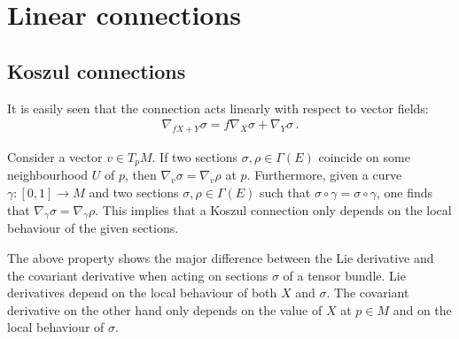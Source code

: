 \section{Linear connections}\label{section:linear_connections}
\subsection{Koszul connections}

    \begin{property}[Linearity]
        It is easily seen that the connection acts linearly with respect to vector fields:
        \begin{gather}
            \nabla_{fX+Y}\sigma = f\nabla_X\sigma + \nabla_Y\sigma\,.
        \end{gather}
    \end{property}

    \begin{property}
        Consider a vector $v\in T_pM$. If two sections $\sigma,\rho\in\Gamma(E)$ coincide on some neighbourhood $U$ of $p$, then $\nabla_v\sigma=\nabla_v\rho$ at $p$. Furthermore, given a curve $\gamma:[0,1]\rightarrow M$ and two sections $\sigma,\rho\in\Gamma(E)$ such that $\sigma\circ\gamma=\sigma\circ\gamma$, one finds that $\nabla_{\dot\gamma}\sigma=\nabla_{\dot\gamma}\rho$. This implies that a Koszul connection only depends on the local behaviour of the given sections.
    \end{property}
    \begin{remark}
        The above property shows the major difference between the Lie derivative and the covariant derivative when acting on sections $\sigma$ of a tensor bundle. Lie derivatives depend on the local behaviour of both $X$ and $\sigma$. The covariant derivative on the other hand only depends on the value of $X$ at $p\in M$ and on the local behaviour of $\sigma$.
    \end{remark}

